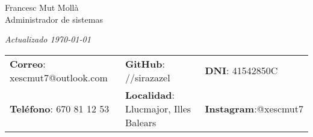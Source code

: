 \documentclass[letterpaper, 11pt]{article}
\begin{document}
\begin{center}
\Huge{Francesc Mut Mollà} \\
\small{Administrador de sistemas}

\end{center}
\hfill{\it\footnotesize Actualizado  \today}


\vspace{1cm} 
\begin{center}
\begin{tabular}{lll}
\textbf{Correo}: xescmut7@outlook.com      &
\hspace{0.55in} \textbf{GitHub}: //sirazazel    &
\hspace{0.4in} 	\textbf{DNI}: 41542850C \\

\textbf{Teléfono}: 670 81 12 53   & 
\hspace{0.55in} \textbf{Localidad}: Llucmajor, Illes Balears &
\hspace {0.4in} \textbf{Instagram}:@xescmut7
\end{tabular}
\end{center}


\setlength{\tabcolsep}{8pt}
\end{document}
